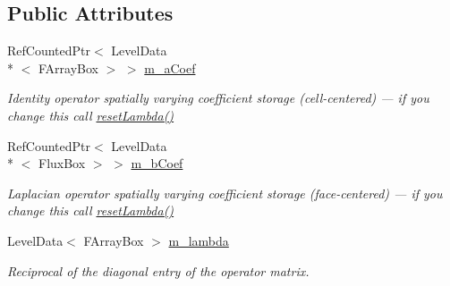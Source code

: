 \subsection*{Public Attributes}
\begin{DoxyCompactItemize}
\item 
\hypertarget{class_v_c_a_m_r_poisson_op_time_dep_a5eb0b4e88e0c09b8c657abff3405e131}{Ref\-Counted\-Ptr$<$ Level\-Data\\*
$<$ F\-Array\-Box $>$ $>$ \hyperlink{class_v_c_a_m_r_poisson_op_time_dep_a5eb0b4e88e0c09b8c657abff3405e131}{m\-\_\-a\-Coef}}\label{class_v_c_a_m_r_poisson_op_time_dep_a5eb0b4e88e0c09b8c657abff3405e131}

\begin{DoxyCompactList}\small\item\em Identity operator spatially varying coefficient storage (cell-\/centered) --- if you change this call \hyperlink{class_v_c_a_m_r_poisson_op_time_dep_a40c3515b270a770bc0ea378ed960c188}{reset\-Lambda()} \end{DoxyCompactList}\item 
\hypertarget{class_v_c_a_m_r_poisson_op_time_dep_ab58cd98ccd7681941c19689a3962992c}{Ref\-Counted\-Ptr$<$ Level\-Data\\*
$<$ Flux\-Box $>$ $>$ \hyperlink{class_v_c_a_m_r_poisson_op_time_dep_ab58cd98ccd7681941c19689a3962992c}{m\-\_\-b\-Coef}}\label{class_v_c_a_m_r_poisson_op_time_dep_ab58cd98ccd7681941c19689a3962992c}

\begin{DoxyCompactList}\small\item\em Laplacian operator spatially varying coefficient storage (face-\/centered) --- if you change this call \hyperlink{class_v_c_a_m_r_poisson_op_time_dep_a40c3515b270a770bc0ea378ed960c188}{reset\-Lambda()} \end{DoxyCompactList}\item 
\hypertarget{class_v_c_a_m_r_poisson_op_time_dep_a7566c53a495987b40dc072b8220ffce0}{Level\-Data$<$ F\-Array\-Box $>$ \hyperlink{class_v_c_a_m_r_poisson_op_time_dep_a7566c53a495987b40dc072b8220ffce0}{m\-\_\-lambda}}\label{class_v_c_a_m_r_poisson_op_time_dep_a7566c53a495987b40dc072b8220ffce0}

\begin{DoxyCompactList}\small\item\em Reciprocal of the diagonal entry of the operator matrix. \end{DoxyCompactList}\end{DoxyCompactItemize}
